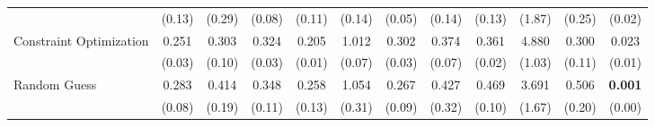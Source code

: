 \begin{table}[ht]
{\begin{tabular}{l cccc cccc cc c}
             & (0.13) & (0.29) & (0.08) & (0.11) & (0.14) & (0.05) & (0.14) & (0.13) & (1.87) & (0.25) & (0.02) \\
            \addlinespace[0.2em]
            Constraint Optimization & 0.251 & 0.303 & 0.324 & 0.205 & 1.012 & 0.302 & 0.374 & 0.361 & 4.880 & 0.300 & 0.023 \\
             & (0.03) & (0.10) & (0.03) & (0.01) & (0.07) & (0.03) & (0.07) & (0.02) & (1.03) & (0.11) & (0.01) \\
            \addlinespace[0.2em]
            Random Guess & 0.283 & 0.414 & 0.348 & 0.258 & 1.054 & 0.267 & 0.427 & 0.469 & 3.691 & 0.506 & \textbf{0.001} \\
             & (0.08) & (0.19) & (0.11) & (0.13) & (0.31) & (0.09) & (0.32) & (0.10) & (1.67) & (0.20) & (0.00) \\
            \bottomrule
        \end{tabular}%
    }
\end{table}